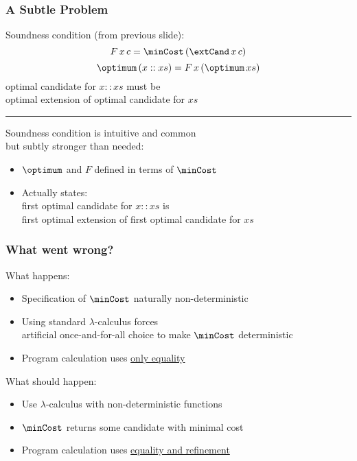 \documentclass{beamer}
\begin{document}
\begin{frame}\frametitle{A Subtle Problem}
{{\color{gray}
Soundness condition (from previous slide):
  \[F\,x\,c = \minCost\,(\extCand\,x\,c)\]
  \[\optimum\,(x::xs) = F\,x\,(\optimum\,xs)\]
optimal candidate for $x::xs$ must be \\ optimal extension of optimal candidate for $xs$
}}
\hrule
\vspace{.5cm}

Soundness condition is intuitive and common\\
but subtly stronger than needed:
\begin{itemize}
\item $\optimum$ and $F$ defined in terms of $\minCost$
\item Actually states:\\
  \alert{first} optimal candidate for $x::xs$ is \\ \alert{first} optimal extension of \alert{first} optimal candidate for $xs$
\end{itemize}
\end{frame}

\begin{frame}\frametitle{What went wrong?}
What happens:
\begin{itemize}
\item Specification of $\minCost$ naturally non-deterministic
\item Using standard $\lambda$-calculus forces\\ artificial once-and-for-all choice to make $\minCost$ deterministic
\item Program calculation uses \underline{only equality}
\end{itemize}

What should happen:
\begin{itemize}
\item Use $\lambda$-calculus with non-deterministic functions
\item $\minCost$ returns \alert{some} candidate with minimal cost
\item Program calculation uses \underline{equality and refinement}
\end{itemize}

\end{frame}
\end{document}

